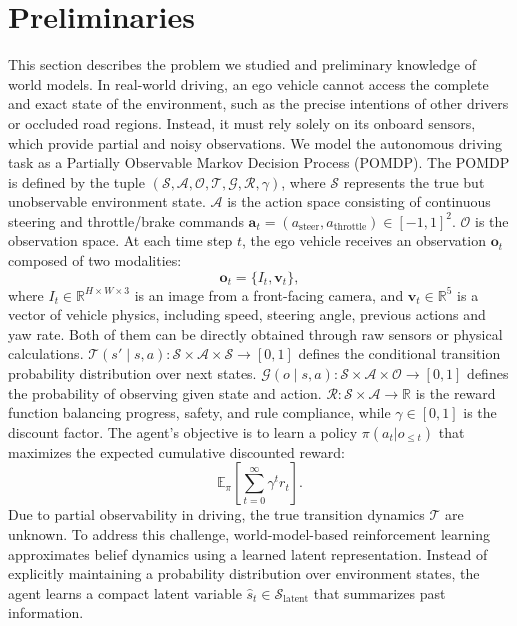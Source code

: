 \section{Preliminaries} \label{02_modeling}
This section describes the problem we studied and preliminary
knowledge of world models.
In real-world driving, an ego vehicle cannot access the complete and exact state of the environment, such as the precise intentions of other drivers or occluded road regions. Instead, it must rely solely on its onboard sensors, which provide partial and noisy observations. We model the autonomous driving task as a Partially Observable Markov Decision Process (POMDP).  The POMDP is defined by the tuple $(\mathcal{S}, \mathcal{A}, \mathcal{O}, \mathcal{T}, \mathcal{G}, \mathcal{R}, \gamma)$, where  $\mathcal{S}$ represents the true but unobservable environment state. $\mathcal{A}$ is the action space consisting of continuous steering and throttle/brake commands $\mathbf{a}_t = (a_{\text{steer}}, a_{\text{throttle}}) \in [-1, 1]^2$. $\mathcal{O}$ is the observation space. At each time step $t$, the ego vehicle receives an observation $\mathbf{o}_t$ composed of two modalities:
\begin{equation}
\mathbf{o}_t = \{I_t, \mathbf{v}_t\},
\end{equation}
where $I_t \in \mathbb{R}^{H \times W \times 3}$ is an image from a front-facing camera, and $\mathbf{v}_t \in \mathbb{R}^5$ is a vector of vehicle physics, including speed, steering angle, previous actions and yaw rate. Both of them can be directly obtained through raw sensors or physical calculations. $\mathcal{T}(s' \mid s, a): \mathcal{S} \times \mathcal{A} \times \mathcal{S} \rightarrow [0, 1]$ defines the conditional transition probability distribution over next states. $\mathcal{G}(o \mid s, a): \mathcal{S} \times \mathcal{A} \times \mathcal{O} \rightarrow [0, 1]$ defines the probability of observing given state and action. $\mathcal{R}: \mathcal{S} \times \mathcal{A} \rightarrow \mathbb{R}$ is the reward function balancing progress, safety, and rule compliance, while $\gamma \in [0, 1]$ is the discount factor. The agent's objective is to learn a policy $\pi(a_t | o_{\leq t})$ that maximizes the expected cumulative discounted reward:
\begin{equation}
\mathbb{E}_{\pi} \left[ \sum_{t=0}^{\infty} \gamma^t r_t \right].
\end{equation}
Due to partial observability in driving, the true transition dynamics $\mathcal{T}$ are unknown. To address this challenge, world-model-based reinforcement learning approximates belief dynamics using a learned latent representation. Instead of explicitly maintaining a probability distribution over environment states, the agent learns a compact latent variable $\hat{s}_{t} \in \mathcal{S}_{\text{latent}}$ that summarizes past information.

